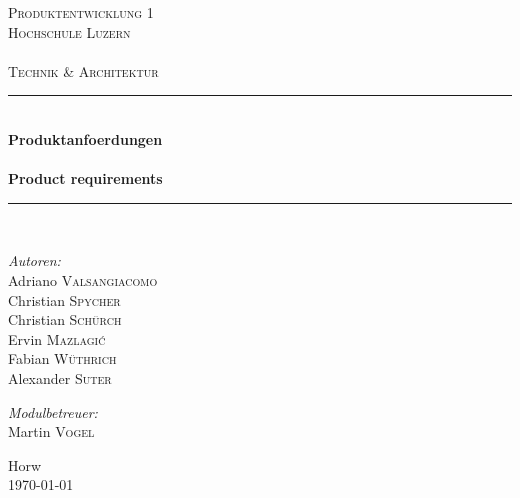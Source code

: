 \begin{titlepage}

\begin{center}

\textsc{\LARGE Produktentwicklung 1}\\[1.5cm]

\textsc{\Large Hochschule Luzern\\
    ~\\
    Technik \& Architektur}\\[0.5cm]

\vfill{}

\newcommand{\HRule}{\rule{\linewidth}{0.5mm}}
\HRule \\[0.4cm]
{   \Huge \bfseries Produktanfoerdungen\\
        ~\\
        \large Product requirements}\\[0.4cm]

\HRule \\[1.5cm]

\begin{minipage}{0.4\textwidth}
    \begin{flushleft} \large
        \emph{Autoren:}\\
        Adriano \textsc{Valsangiacomo}\\
        Christian \textsc{Spycher}\\
        Christian \textsc{Schürch}\\
        Ervin \textsc{Mazlagi\'c}\\
        Fabian \textsc{Wüthrich}\\
        Alexander \textsc{Suter}\\
    \end{flushleft}
\end{minipage}
\hfill
\begin{minipage}{0.4\textwidth}
    \begin{flushright} \large
        \emph{Modulbetreuer:} \\
        Martin \textsc{Vogel}
    \end{flushright}
\end{minipage}

\vfill{}
\vfill{}
\vfill{}

{\large Horw\\ \today}

\end{center}

\end{titlepage}
